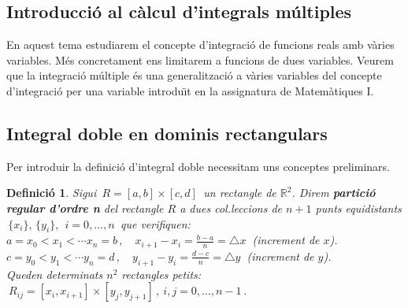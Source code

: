 \documentclass[12pt]{article}
\newtheorem{definicio}{Definici{\'o}}[subsection]
\newcommand{\R}{\mathbb{R}}
\begin{document}
\begin{center}
\section{Introducci{\'o} al c{\`a}lcul d'integrals m{\'u}ltiples}
\end{center}

\parskip =0.3cm
\parindent =0cm
\itemindent=2cm

En aquest tema estudiarem el concepte d'integraci{\'o} de funcions reals
amb v{\`a}ries variables. M{\'e}s concretament ens limitarem
a funcions de dues variables.
Veurem que la integraci{\'o} m{\'u}ltiple {\'e}s una generalitzaci{\'o} a
v{\`a}ries variables del concepte d'integraci{\'o} per una variable
introdu{\"\i}t en la assignatura de Matem{\`a}tiques I.

\vspace*{1cm}
\subsection{Integral doble en dominis rectangulars}

Per introduir la definici{\'o} d'integral doble necessitam uns conceptes
preliminars.

\begin{definicio}
Sigui $\, R=[a,b]\times[c,d]\,$ un rectangle de $\R^2$. Direm
\textbf{partici{\'o} regular d'ordre n} del rectangle $R$ a dues
col.leccions de $n+1$ punts equidistants $\,\{x_i\}, \, \{y_i\}, \ \
i=0,\ldots
,n\,$ que verifiquen:\\

\hspace{3cm}$a=x_0<x_1<\cdots x_n=b\,,\quad
x_{i+1}-x_i=\frac{b-a}{n}=\triangle x\ $ (increment de $x$).\\

\hspace{3cm}$c=y_0<y_1<\cdots y_n=d\,,\quad
y_{i+1}-y_i=\frac{d-c}{n}=\triangle y\ $ (increment de $y$).\\

Queden determinats $n^2$ rectangles petits: $\
R_{ij}=[x_i,x_{i+1}]\times[y_j,y_{j+1}]\,,\ i,j=0,\ldots,n-1\,$.
\end{definicio}
\end{document}
